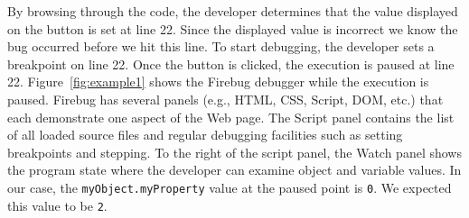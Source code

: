 \documentclass{sig-alternate}
\begin{document}
By browsing through the code,%
 the developer determines that the value displayed on the 
button is set at line 22. Since the displayed value is incorrect we know 
the bug occurred before we hit this line.
To start debugging, the developer sets a breakpoint
on line 22. Once the button is clicked, the execution is paused at line
22. Figure~\ref{fig:example1} shows the Firebug debugger while the
execution is paused. Firebug has several panels (e.g., HTML, CSS,
Script, DOM, etc.) that each demonstrate one aspect of the Web page.
The Script panel contains the list of all loaded source
files and regular debugging facilities such as setting breakpoints and
stepping. To the right of the script panel, the Watch panel shows the program state
where the developer can examine object and variable values. In our case, the
\texttt{myObject.myProperty} value at the paused point is \texttt{0}. We expected this value to be \texttt{2}.
\end{document}
